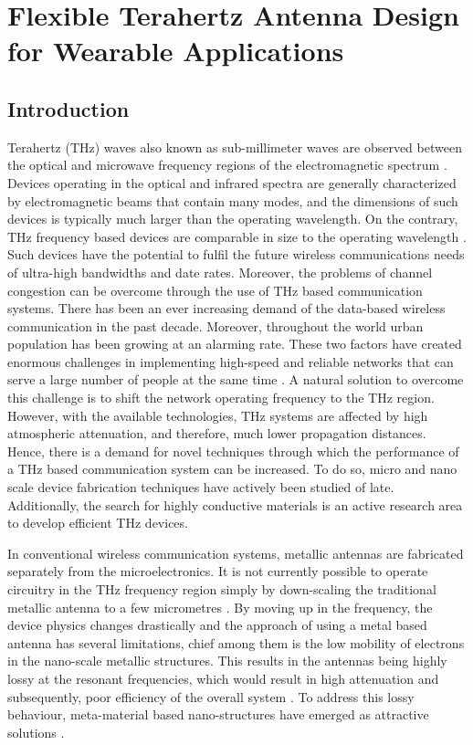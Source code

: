 \documentclass[12pt]{suhbook}
\begin{document}
% 
% 
% 
\setcounter{chapter}{3}%
% 
% 
% 
\chapter{Flexible Terahertz Antenna Design for Wearable Applications}
% 
% 
% 
\section{Introduction}
% 
% 
Terahertz (THz) waves also known as sub-millimeter waves are observed between the optical and microwave frequency regions of the electromagnetic spectrum \cite{liu2009advanced,grischkowsky1990far}. Devices operating in the optical and infrared spectra are generally characterized by electromagnetic beams that contain many modes, and the dimensions of such devices is typically much larger than the operating wavelength. On the contrary, THz frequency based devices are comparable in size to the operating wavelength \cite{shi2018thz}. Such devices have the potential to fulfil the future wireless communications needs of ultra-high bandwidths and date rates. Moreover, the problems of channel congestion can be overcome through the use of THz based communication systems. 
There has been an ever increasing demand of the data-based wireless communication in the past decade. Moreover, throughout the world urban population has been growing at an alarming rate. These two factors have created enormous challenges in implementing high-speed and reliable networks that can serve a large number of people at the same time \cite{song2011present}. A natural solution to overcome this challenge is to shift the network operating frequency to the THz region. However, with the available technologies, THz systems are affected by high atmospheric attenuation, and therefore, much lower propagation distances. Hence, there is a demand for novel techniques through which the performance of a THz based communication system can be increased. To do so, micro and nano scale device fabrication techniques have actively been studied of late. Additionally, the search for highly conductive materials is an active research area to develop efficient THz devices.

In conventional wireless communication systems, metallic antennas are fabricated separately from the microelectronics. It is not currently possible to operate circuitry in the THz frequency region simply by down-scaling the traditional metallic antenna to a few micrometres \cite{kleine2011review}. By moving up in the frequency, the device physics changes drastically and the approach of using a metal based antenna has several limitations, chief among them is the low mobility of electrons in the nano-scale metallic structures. This results in the antennas being highly lossy at the resonant frequencies, which would result in high attenuation and subsequently, poor efficiency of the overall system \cite{pourahmadazar2018millimeter}. To address this lossy behaviour, meta-material based nano-structures have emerged as attractive solutions \cite{chen2006active}.
% 
% 
% 
\end{document}
